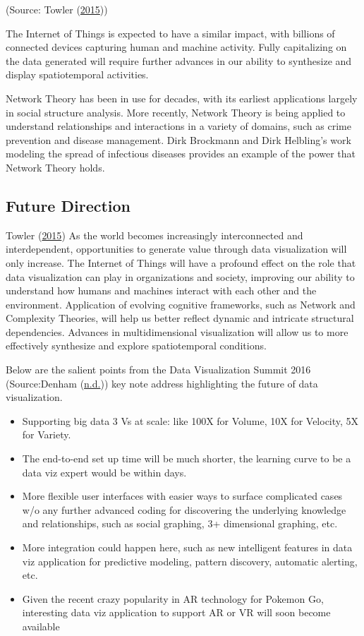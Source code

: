\documentclass[]{book}
\providecommand{\tightlist}{%
  \setlength{\itemsep}{0pt}\setlength{\parskip}{0pt}}
\begin{document}
(Source: Towler (\protect\hyperlink{ref-future_viz}{2015}))

The Internet of Things is expected to have a similar impact, with billions of connected devices capturing human and machine activity. Fully capitalizing on the data generated will require further advances in our ability to synthesize and display spatiotemporal activities.

Network Theory has been in use for decades, with its earliest applications largely in social structure analysis. More recently, Network Theory is being applied to understand relationships and interactions in a variety of domains, such as crime prevention and disease management. Dirk Brockmann and Dirk Helbling's work modeling the spread of infectious diseases provides an example of the power that Network Theory holds.

\hypertarget{future-direction}{%
\subsection{Future Direction}\label{future-direction}}

Towler (\protect\hyperlink{ref-future_viz}{2015})
As the world becomes increasingly interconnected and interdependent, opportunities to generate value through data visualization will only increase. The Internet of Things will have a profound effect on the role that data visualization can play in organizations and society, improving our ability to understand how humans and machines interact with each other and the environment. Application of evolving cognitive frameworks, such as Network and Complexity Theories, will help us better reflect dynamic and intricate structural dependencies. Advances in multidimensional visualization will allow us to more effectively synthesize and explore spatiotemporal conditions.

Below are the salient points from the Data Visualization Summit 2016 (Source:Denham (\protect\hyperlink{ref-speaker_notes}{n.d.})) key note address highlighting the future of data visualization.

\begin{itemize}
\tightlist
\item
  Supporting big data 3 Vs at scale: like 100X for Volume, 10X for Velocity, 5X for Variety.
\item
  The end-to-end set up time will be much shorter, the learning curve to be a data viz expert would be within days.
\item
  More flexible user interfaces with easier ways to surface complicated cases w/o any further advanced coding for discovering the underlying knowledge and relationships, such as social graphing, 3+ dimensional graphing, etc.
\item
  More integration could happen here, such as new intelligent features in data viz application for predictive modeling, pattern discovery, automatic alerting, etc.
\item
  Given the recent crazy popularity in AR technology for Pokemon Go, interesting data viz application to support AR or VR will soon become available
\end{itemize}
\end{document}
